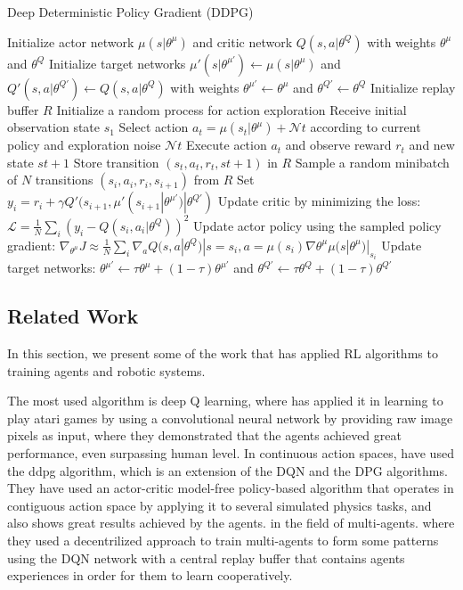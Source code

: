 \documentclass[12pt]{extarticle}
\begin{document}
 
\begin{algorithm}[H]
\caption{Deep Deterministic Policy Gradient (DDPG)}
\label{alg:ddpg}
\begin{algorithmic}[1]
\State Initialize actor network $\mu(s|\theta^\mu)$ and critic network $Q(s,a|\theta^Q)$ with weights $\theta^\mu$ and $\theta^Q$
\State Initialize target networks $\mu'(s|\theta^{\mu'}) \leftarrow \mu(s|\theta^\mu)$ and $Q'(s,a|\theta^{Q'}) \leftarrow Q(s,a|\theta^Q)$ with weights $\theta^{\mu'} \leftarrow \theta^\mu$ and $\theta^{Q'} \leftarrow \theta^Q$
\State Initialize replay buffer $R$
\State Initialize a random process for action exploration
\State Receive initial observation state $s_1$
\State Select action $a_t = \mu(s_t|\theta^\mu) + \mathcal{N}t$ according to current policy and exploration noise $\mathcal{N}t$
\State Execute action $a_t$ and observe reward $r_t$ and new state $s{t+1}$
\State Store transition $(s_t, a_t, r_t, s{t+1})$ in $R$
\State Sample a random minibatch of $N$ transitions $(s_i, a_i, r_i, s_{i+1})$ from $R$
\State Set $y_i = r_i + \gamma Q'(s_{i+1},\mu'(s_{i+1}|\theta^{\mu'})|\theta^{Q'})$
\State Update critic by minimizing the loss: $\mathcal{L} = \frac{1}{N}\sum_i(y_i - Q(s_i,a_i|\theta^Q))^2$
\State Update actor policy using the sampled policy gradient: $\nabla_{\theta^\mu} J \approx \frac{1}{N}\sum_i \nabla_a Q(s,a|\theta^Q)|{s=s_i,a=\mu(s_i)} \nabla{\theta^\mu} \mu(s|\theta^\mu)|_{s_i}$
\State Update target networks: $\theta^{\mu'} \leftarrow \tau \theta^\mu + (1-\tau)\theta^{\mu'}$ and $\theta^{Q'} \leftarrow \tau \theta^Q + (1-\tau)\theta^{Q'}$
\EndFor
\EndFor
\end{algorithmic}
\end{algorithm}




\subsection{Related Work}
In this section, we present some of the work that has applied RL algorithms to training agents and robotic systems.

The most used algorithm is deep Q learning, where \cite{mnih2013playing} has applied it in learning to play atari games by using a convolutional neural network by providing raw image pixels as input, where they demonstrated that the agents achieved great performance, even surpassing human level.
In continuous action spaces, \cite{lillicrap2015continuous} have used the ddpg algorithm, which is an extension of the DQN and the DPG algorithms. They have used an actor-critic model-free policy-based algorithm that operates in contiguous action space by applying it to several simulated physics tasks, and also shows great results achieved by the agents.
in the field of multi-agents. \cite{diallo2020multi} where they used a decentrilized approach to train multi-agents to form some patterns using the DQN network with a central replay buffer that contains agents experiences in order for them to learn cooperatively.
\end{document}
